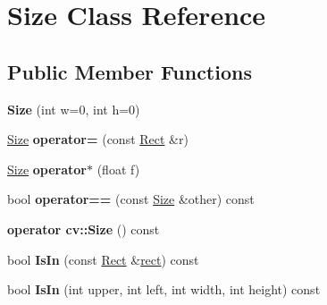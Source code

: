 \hypertarget{classSize}{}\section{Size Class Reference}
\label{classSize}
\subsection*{Public Member Functions}
\begin{DoxyCompactItemize}
\item 
\hypertarget{classSize_a0ea0a7599bb78efd82b1a15d2bf99949}{}{\bfseries Size} (int w=0, int h=0)\label{classSize_a0ea0a7599bb78efd82b1a15d2bf99949}

\item 
\hypertarget{classSize_a1afcc84f430e6034f296f0b167f76d51}{}\hyperlink{classSize}{Size} {\bfseries operator=} (const \hyperlink{classRect}{Rect} \&r)\label{classSize_a1afcc84f430e6034f296f0b167f76d51}

\item 
\hypertarget{classSize_ac806d63f500f065ce5eddfaaf8b0bb07}{}\hyperlink{classSize}{Size} {\bfseries operator$\ast$} (float f)\label{classSize_ac806d63f500f065ce5eddfaaf8b0bb07}

\item 
\hypertarget{classSize_a11cb27cff6cc1767a76fec0e1f5dd4d2}{}bool {\bfseries operator==} (const \hyperlink{classSize}{Size} \&other) const \label{classSize_a11cb27cff6cc1767a76fec0e1f5dd4d2}

\item 
\hypertarget{classSize_a86c63935aa4a5ccbd1da690384c83e8d}{}{\bfseries operator cv\+::\+Size} () const \label{classSize_a86c63935aa4a5ccbd1da690384c83e8d}

\item 
\hypertarget{classSize_acc9ecf605ea24081cadab96251871ceb}{}bool {\bfseries Is\+In} (const \hyperlink{classRect}{Rect} \&\hyperlink{structrect}{rect}) const \label{classSize_acc9ecf605ea24081cadab96251871ceb}

\item 
\hypertarget{classSize_abdc0f59bfaa22ebc9d21345a372ca032}{}bool {\bfseries Is\+In} (int upper, int left, int width, int height) const \label{classSize_abdc0f59bfaa22ebc9d21345a372ca032}

\end{DoxyCompactItemize}
